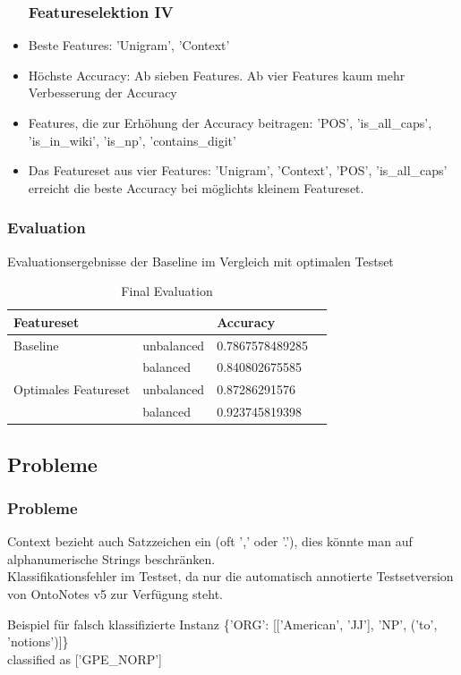 \documentclass{beamer}
\begin{document}
	\begin{frame}
		\begin{itemize}
			\frametitle{Featureselektion IV}
			\item <+->Beste Features: 'Unigram', 'Context'\\
			\item <+->Höchste Accuracy: Ab sieben Features. Ab vier Features kaum mehr Verbesserung der Accuracy \\
			\item <+->Features, die zur Erhöhung der Accuracy beitragen: 'POS', 'is\_all\_caps', 'is\_in\_wiki', 'is\_np', 'contains\_digit'\\
			\item <+->Das Featureset aus vier Features: 'Unigram', 'Context', 'POS', 'is\_all\_caps' erreicht die beste Accuracy bei möglichts kleinem Featureset.
		\end{itemize}
	\end{frame}
	\begin{frame}
		\frametitle{Evaluation}
		Evaluationsergebnisse der Baseline im Vergleich mit optimalen Testset
				\begin{table}
					\caption{Final Evaluation}
					\begin{tabularx}{\textwidth}{llll}
						Featureset & & Accuracy\\
						\toprule
						Baseline & unbalanced & 0.7867578489285\\
								 & balanced & 0.840802675585\\
						Optimales Featureset	 & unbalanced & 0.87286291576\\
								 & balanced & 0.923745819398\\
						\bottomrule
					\end{tabularx}
					\label{tab:allf2}
				\end{table}	
		
		
		
		
	\end{frame}
		\subsection{Probleme}
		\begin{frame}
			\frametitle{Probleme}
			Context bezieht auch Satzzeichen ein (oft ',' oder '.'), dies könnte man auf alphanumerische Strings beschränken.\\
			
			Klassifikationsfehler im Testset, da nur die automatisch annotierte Testsetversion von OntoNotes v5 zur Verfügung steht.\\
			
			\begin{exampleblock}{Beispiel für falsch klassifizierte Instanz}
				\{'ORG': [['American', 'JJ'], 'NP', ('to', 'notions')]\}\\classified as ['GPE\_NORP']
			\end{exampleblock}
			
			
		\end{frame}
\end{document}
